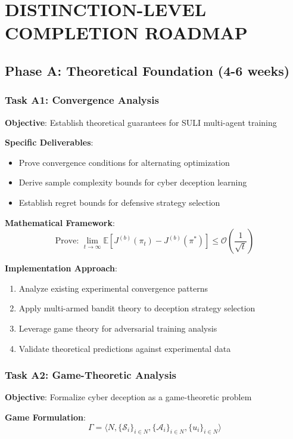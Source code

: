 \documentclass[11pt]{article}
\begin{document}
\section{DISTINCTION-LEVEL COMPLETION ROADMAP}

\subsection{Phase A: Theoretical Foundation (4-6 weeks)}

\subsubsection{Task A1: Convergence Analysis}
\textbf{Objective}: Establish theoretical guarantees for SULI multi-agent training

\textbf{Specific Deliverables}:
\begin{itemize}
\item Prove convergence conditions for alternating optimization
\item Derive sample complexity bounds for cyber deception learning
\item Establish regret bounds for defensive strategy selection
\end{itemize}

\textbf{Mathematical Framework}:
\begin{equation}
\text{Prove: } \lim_{t \rightarrow \infty} \mathbb{E}[J^{(b)}(\pi_t) - J^{(b)}(\pi^*)] \leq \mathcal{O}\left(\frac{1}{\sqrt{t}}\right)
\end{equation}

\textbf{Implementation Approach}:
\begin{enumerate}
\item Analyze existing experimental convergence patterns
\item Apply multi-armed bandit theory to deception strategy selection  
\item Leverage game theory for adversarial training analysis
\item Validate theoretical predictions against experimental data
\end{enumerate}

\subsubsection{Task A2: Game-Theoretic Analysis}
\textbf{Objective}: Formalize cyber deception as a game-theoretic problem

\textbf{Game Formulation}:
\begin{equation}
\Gamma = \langle N, \{\mathcal{S}_i\}_{i \in N}, \{\mathcal{A}_i\}_{i \in N}, \{u_i\}_{i \in N} \rangle
\end{equation}
\end{document}
